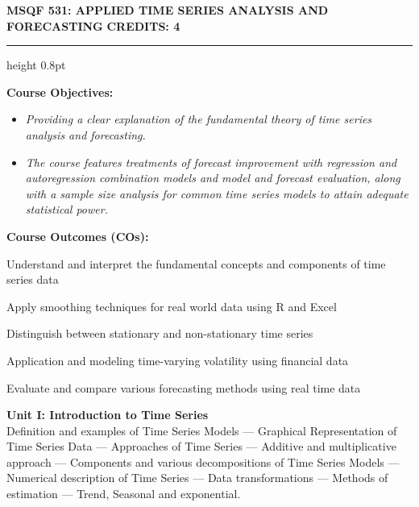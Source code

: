 
\newpage
\thispagestyle{plain}

\begin{center}
    {\large\textbf{MSQF 531: APPLIED TIME SERIES ANALYSIS AND FORECASTING}} \hfill {\large\textbf{CREDITS: 4}}
\end{center}
\vspace{-0.6em}
\hrule height 0.8pt
\vspace{0.6em}

\noindent\textbf{Course Objectives:}
\begin{itemize}[leftmargin=1.5em, label=$\bullet$, noitemsep, topsep=1pt, parsep=1pt]
    \item \textit{Providing a clear explanation of the fundamental theory of time series analysis and forecasting.}
    \item \textit{The course features treatments of forecast improvement with regression and autoregression combination models and model and forecast evaluation, along with a sample size analysis for common time series models to attain adequate statistical power.}
\end{itemize}

\vspace{0.4em}
\noindent\textbf{Course Outcomes (COs):}
\begin{description}[leftmargin=1.4cm, labelsep=0.4em, itemsep=1pt, topsep=1pt, parsep=0pt, font=\normalfont\textbf]
    \item[CO1:] Understand and interpret the fundamental concepts and components of time series data
    \item[CO2:] Apply smoothing techniques for real world data using R and Excel
    \item[CO3:] Distinguish between stationary and non-stationary time series
    \item[CO4:] Application and modeling time-varying volatility using financial data
    \item[CO5:] Evaluate and compare various forecasting methods using real time data
\end{description}

\vspace{0.4em}
\noindent\textbf{Unit I: Introduction to Time Series}\\
\small
Definition and examples of Time Series Models --- Graphical Representation of Time Series Data --- Approaches of Time Series --- Additive and multiplicative approach --- Components and various decompositions of Time Series Models --- Numerical description of Time Series --- Data transformations --- Methods of estimation --- Trend, Seasonal and exponential.
\normalsize


